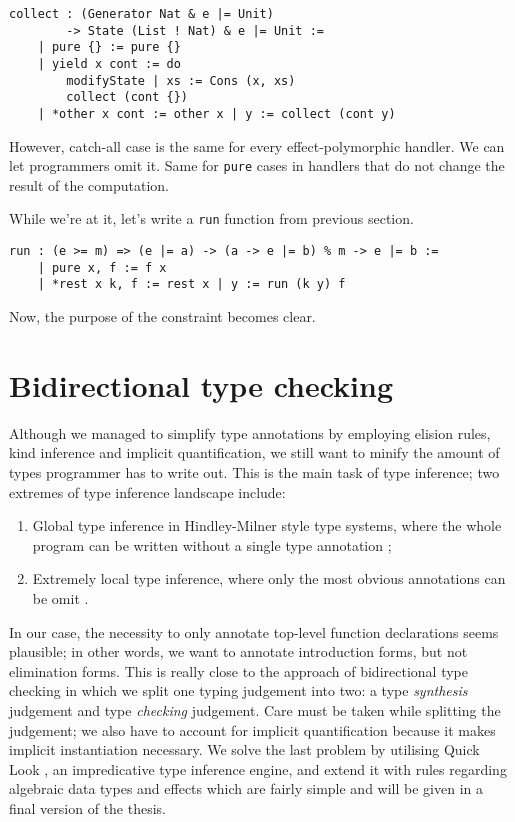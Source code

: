 \documentclass[a4paper,14pt]{extreport}
\begin{document}
\begin{verbatim}
collect : (Generator Nat & e |= Unit)
        -> State (List ! Nat) & e |= Unit :=
    | pure {} := pure {}
    | yield x cont := do
        modifyState | xs := Cons (x, xs)
        collect (cont {})
    | *other x cont := other x | y := collect (cont y)
\end{verbatim}

However, catch-all case is the same for every effect-polymorphic handler. We can
let programmers omit it. Same for \verb|pure| cases in handlers that do not
change the result of the computation.

While we're at it, let's write a \verb|run| function from previous section.

\begin{verbatim}
run : (e >= m) => (e |= a) -> (a -> e |= b) % m -> e |= b :=
    | pure x, f := f x
    | *rest x k, f := rest x | y := run (k y) f
\end{verbatim}

Now, the purpose of the constraint becomes clear.

\section{Bidirectional type checking}

Although we managed to simplify type annotations by employing elision rules,
kind inference and implicit quantification, we still want to minify the amount
of types programmer has to write out. This is the main task of type inference;
two extremes of type inference landscape include:

\begin{enumerate}
    \item Global type inference in Hindley-Milner style type systems, where the
        whole program can be written without a single type annotation
        \cite{milner};
    \item Extremely local type inference, where only the most obvious
        annotations can be omit \cite{go}.
\end{enumerate}

In our case, the necessity to only annotate top-level function declarations
seems plausible; in other words, we want to annotate introduction forms, but not
elimination forms. This is really close to the approach of bidirectional type
checking \cite{bidirectional} in which we split one typing judgement into two: a
type \textit{synthesis} judgement and type \textit{checking} judgement. Care
must be taken while splitting the judgement; we also have to account for
implicit quantification because it makes implicit instantiation necessary. We
solve the last problem by utilising Quick Look \cite{quick-look}, an
impredicative type inference engine, and extend it with rules regarding
algebraic data types and effects which are fairly simple and will be given in a
final version of the thesis.
\end{document}
